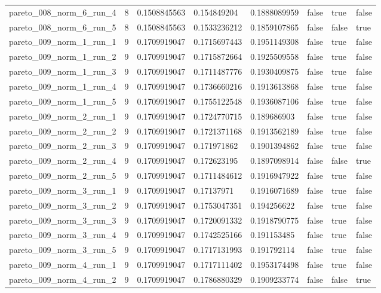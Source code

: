 \begin{tabular}{@{}llllllll@{}}
pareto\_008\_norm\_6\_run\_4 & 8 & 0.1508845563 & 0.154849204 & 0.1888089959 & false & true & false \\
pareto\_008\_norm\_6\_run\_5 & 8 & 0.1508845563 & 0.1533236212 & 0.1859107865 & false & false & true \\
pareto\_009\_norm\_1\_run\_1 & 9 & 0.1709919047 & 0.1715697443 & 0.1951149308 & false & true & false \\
pareto\_009\_norm\_1\_run\_2 & 9 & 0.1709919047 & 0.1715872664 & 0.1925509558 & false & true & false \\
pareto\_009\_norm\_1\_run\_3 & 9 & 0.1709919047 & 0.1711487776 & 0.1930409875 & false & true & false \\
pareto\_009\_norm\_1\_run\_4 & 9 & 0.1709919047 & 0.1736660216 & 0.1913613868 & false & true & false \\
pareto\_009\_norm\_1\_run\_5 & 9 & 0.1709919047 & 0.1755122548 & 0.1936087106 & false & true & false \\
pareto\_009\_norm\_2\_run\_1 & 9 & 0.1709919047 & 0.1724770715 & 0.189686903 & false & true & false \\
pareto\_009\_norm\_2\_run\_2 & 9 & 0.1709919047 & 0.1721371168 & 0.1913562189 & false & true & false \\
pareto\_009\_norm\_2\_run\_3 & 9 & 0.1709919047 & 0.171971862 & 0.1901394862 & false & true & false \\
pareto\_009\_norm\_2\_run\_4 & 9 & 0.1709919047 & 0.172623195 & 0.1897098914 & false & false & true \\
pareto\_009\_norm\_2\_run\_5 & 9 & 0.1709919047 & 0.1711484612 & 0.1916947922 & false & true & false \\
pareto\_009\_norm\_3\_run\_1 & 9 & 0.1709919047 & 0.17137971 & 0.1916071689 & false & true & false \\
pareto\_009\_norm\_3\_run\_2 & 9 & 0.1709919047 & 0.1753047351 & 0.194256622 & false & true & false \\
pareto\_009\_norm\_3\_run\_3 & 9 & 0.1709919047 & 0.1720091332 & 0.1918790775 & false & true & false \\
pareto\_009\_norm\_3\_run\_4 & 9 & 0.1709919047 & 0.1742525166 & 0.191153485 & false & true & false \\
pareto\_009\_norm\_3\_run\_5 & 9 & 0.1709919047 & 0.1717131993 & 0.191792114 & false & true & false \\
pareto\_009\_norm\_4\_run\_1 & 9 & 0.1709919047 & 0.1717111402 & 0.1953174498 & false & true & false \\
pareto\_009\_norm\_4\_run\_2 & 9 & 0.1709919047 & 0.1786880329 & 0.1909233774 & false & false & true \\

\end{tabular}
